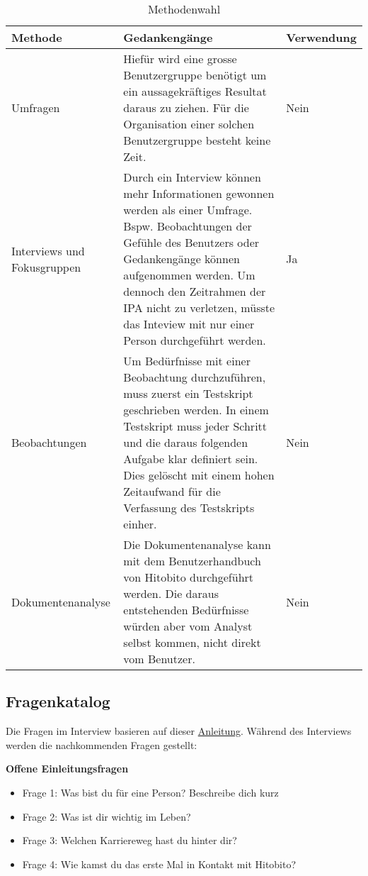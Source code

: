\begin{table}[h!]
   \begin{tabular}{|L{0.2\textwidth}|L{0.5\textwidth}|L{0.2\textwidth}|}
       \hline
       \color{white}Methode & \color{white} Gedankengänge & \color{white} Verwendung \\
       \hline
       Umfragen & Hiefür wird eine grosse Benutzergruppe benötigt um ein aussagekräftiges Resultat daraus zu ziehen. 
       Für die Organisation einer solchen Benutzergruppe besteht keine Zeit. & Nein \\
       \hline
       Interviews und Fokusgruppen & Durch ein Interview können mehr Informationen gewonnen werden als einer Umfrage.
       Bspw. Beobachtungen der Gefühle des Benutzers oder Gedankengänge können aufgenommen werden. Um dennoch den Zeitrahmen der IPA
       nicht zu verletzen, müsste das Inteview mit nur einer Person durchgeführt werden. & Ja \\
       \hline
       Beobachtungen & Um Bedürfnisse mit einer Beobachtung durchzuführen, muss zuerst ein Testskript geschrieben werden.
       In einem Testskript muss jeder Schritt und die daraus folgenden Aufgabe klar definiert sein. Dies gelöscht
       mit einem hohen Zeitaufwand für die Verfassung des Testskripts einher. & Nein \\
       \hline
       Dokumentenanalyse & Die Dokumentenanalyse kann mit dem Benutzerhandbuch von Hitobito durchgeführt werden.
      Die daraus entstehenden Bedürfnisse würden aber vom Analyst selbst kommen, nicht direkt vom Benutzer. & Nein \\
     \hline
     \end{tabular}
     \caption{Methodenwahl}
\end{table}

\newpage

\subsection{Fragenkatalog}
Die Fragen im Interview basieren auf dieser \href{https://kreativ.mfg.de/digitale-kultur/kompass-digitale-kultur/prozess/nutzerinnen-gruppe/bedarfsanalyse-interviews/}{Anleitung}.
Während des Interviews werden die nachkommenden Fragen gestellt:

\textbf{Offene Einleitungsfragen}
\begin{itemize}
   \item Frage 1: Was bist du für eine Person? Beschreibe dich kurz
   \item Frage 2: Was ist dir wichtig im Leben?
   \item Frage 3: Welchen Karriereweg hast du hinter dir? 
   \item Frage 4: Wie kamst du das erste Mal in Kontakt mit Hitobito?
\end{itemize}

